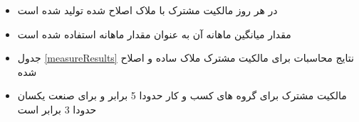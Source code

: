 \documentclass[12pt, a4paper]{article}
\begin{document}
\begin{itemize}
	\item 
	در هر روز مالکیت مشترک با ملاک اصلاح شده تولید شده است
	\item 
مقدار میانگین ماهانه آن به عنوان مقدار ماهانه استفاده شده است
	\item 
جدول 
\ref{measureResults}
نتایج محاسبات برای مالکیت مشترک ملاک ساده و اصلاح شده
\begin{LTR}
\end{LTR}
\item
مالکیت مشترک برای گروه های کسب و کار حدودا 5 برابر و برای صنعت یکسان حدودا 3 برابر است
\end{itemize}









\FloatBarrier



\subsection{} \label{BGDef}
\end{document}
